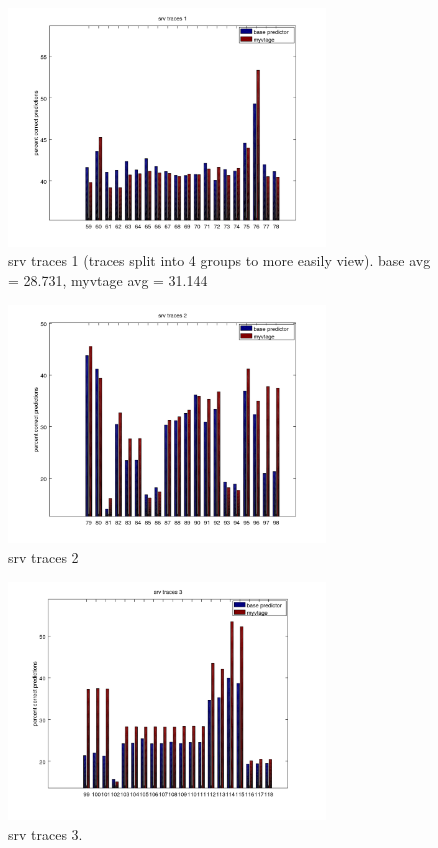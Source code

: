 \documentclass[12pt]{article}
\begin{document}
	\begin{figure}[p]
		\centering
		\includegraphics[width=0.75\textwidth]{srvtraces1.png}
		\caption{srv traces 1 (traces split into 4 groups to more easily view). base avg = 28.731, myvtage avg = 31.144}
		\label{fig:srv1}
	\end{figure}
	\begin{figure}[p]
		\centering
		\includegraphics[width=0.75\textwidth]{srvtraces2.png}
		\caption{srv traces 2}
		\label{fig:srv2}
	\end{figure}
	\begin{figure}[p]
		\centering
		\includegraphics[width=0.75\textwidth]{srvtraces3.png}
		\caption{srv traces 3.}
		\label{fig:srv3}
	\end{figure}
\end{document}
